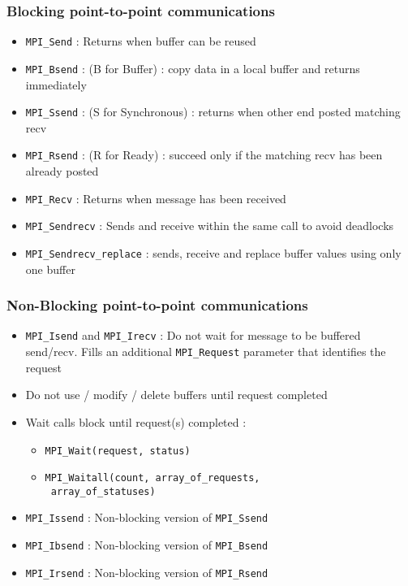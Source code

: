 \begin{frame}[containsverbatim]
\frametitle{Blocking point-to-point communications}
	\begin{itemize}
	\item {\verb+MPI_Send+ : Returns when buffer can be reused}
	\item {\verb+MPI_Bsend+ : (B for Buffer) : copy data in a local buffer and returns immediately }
	\item {\verb+MPI_Ssend+ : (S for Synchronous) : returns when other end posted matching recv}
	\item {\verb+MPI_Rsend+ : (R for Ready) : succeed only if the matching recv has been already posted}
	\item {\verb+MPI_Recv+ : Returns when message has been received }
	\item {\verb+MPI_Sendrecv+ : Sends and receive within the same call to avoid deadlocks}
	\item {\verb+MPI_Sendrecv_replace+ : sends, receive and replace buffer values using only one buffer}
	\end{itemize}
\end{frame}



\begin{frame}[containsverbatim]
\frametitle{Non-Blocking point-to-point communications}
	\begin{itemize}
	\item {\verb+MPI_Isend+ and \verb+MPI_Irecv+ : Do not wait for message to be buffered send/recv. Fills an additional \verb+MPI_Request+ parameter that identifies the request}
	\item {Do not use / modify / delete buffers until request completed}
	\item {Wait calls block until request(s) completed : 
		\begin{itemize}
			\item {\verb+MPI_Wait(request, status)+}
			\item {\verb+MPI_Waitall(count, array_of_requests,+\\ \verb+ array_of_statuses)+}
		\end{itemize}
	}
	\item {\verb+MPI_Issend+ : Non-blocking version of \verb+MPI_Ssend+}
	\item {\verb+MPI_Ibsend+ : Non-blocking version of \verb+MPI_Bsend+}
	\item {\verb+MPI_Irsend+ : Non-blocking version of \verb+MPI_Rsend+}
\end{itemize}
\end{frame}

